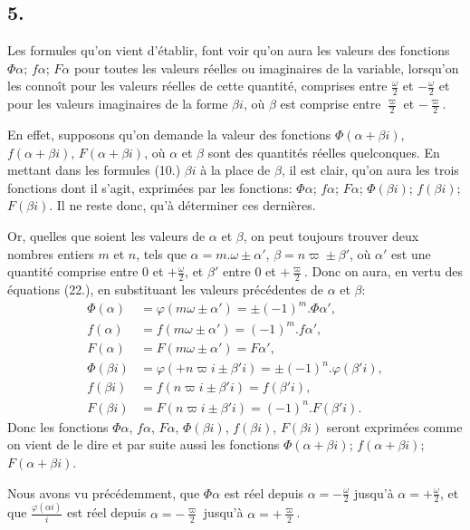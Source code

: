 \documentclass{article}
\begin{document}
\subsection*{5.}

Les formules qu'on vient d'établir, font voir qu'on aura les valeurs des fonctions $\Phi\alpha$; $f\alpha$; $F\alpha$ pour toutes les valeurs réelles ou imaginaires de la variable, lorsqu'on les connoît pour les valeurs réelles de cette quantité, comprises entre $\frac{\omega}{2}$ et $-\frac{\omega}{2}$ et pour les valeurs imaginaires de la forme $\beta i$, où $\beta$ est comprise entre $\frac{\varpi}{2}$ et $-\frac{\varpi}{2}$.

En effet, supposons qu'on demande la valeur des fonctions $\Phi(\alpha+\beta i)$, $f(\alpha+\beta i)$, $F(\alpha+\beta i)$, où $\alpha$ et $\beta$ sont des quantités réelles quelconques. En mettant dans les formules (10.) $\beta i$ à la place de $\beta$, il est clair, qu'on aura les trois fonctions dont il s'agit, exprimées par les fonctions: $\Phi\alpha$; $f\alpha$; $F\alpha$; $\Phi(\beta i)$; $f(\beta i)$; $F(\beta i)$. Il ne reste donc, qu'à déterminer ces dernières.

Or, quelles que soient les valeurs de $\alpha$ et $\beta$, on peut toujours trouver deux nombres entiers $m$ et $n$, tels que $\alpha=m.\omega\pm\alpha'$, $\beta=n\varpi\pm\beta'$, où $\alpha'$ est une quantité comprise entre $0$ et $+\frac{\omega}{2}$, et $\beta'$ entre $0$ et $+\frac{\varpi}{2}$. Donc on aura, en vertu des équations (22.), en substituant les valeurs précédentes de $\alpha$ et $\beta$:
\[ \begin{aligned} \Phi(\alpha)&=\varphi(m\omega\pm\alpha')=\pm(-1)^{m}.\Phi\alpha',\\ f(\alpha)&=f(m\omega\pm\alpha')=(-1)^{m}.f\alpha',\\ F(\alpha)&=F(m\omega\pm\alpha')=F\alpha',\\ \Phi(\beta i)&=\varphi(+n\varpi i\pm\beta'i)=\pm(-1)^{n}.\varphi(\beta'i),\\ f(\beta i)&=f(n\varpi i\pm\beta'i)=f(\beta'i),\\ F(\beta i)&=F(n\varpi i\pm\beta'i)=(-1)^{n}.F(\beta'i). \end{aligned} \]
Donc les fonctions $\Phi\alpha$, $f\alpha$, $F\alpha$, $\Phi(\beta i)$, $f(\beta i)$, $F(\beta i)$ seront exprimées comme on vient de le dire et par suite aussi les fonctions $\Phi(\alpha+\beta i)$; $f(\alpha+\beta i)$; $F(\alpha+\beta i)$.

Nous avons vu précédemment, que $\Phi\alpha$ est réel depuis $\alpha=-\frac{\omega}{2}$ jusqu'à $\alpha=+\frac{\omega}{2}$, et que $\frac{\varphi(\alpha i)}{i}$ est réel depuis $\alpha=-\frac{\varpi}{2}$ jusqu'à $\alpha=+\frac{\varpi}{2}$.
\end{document}
